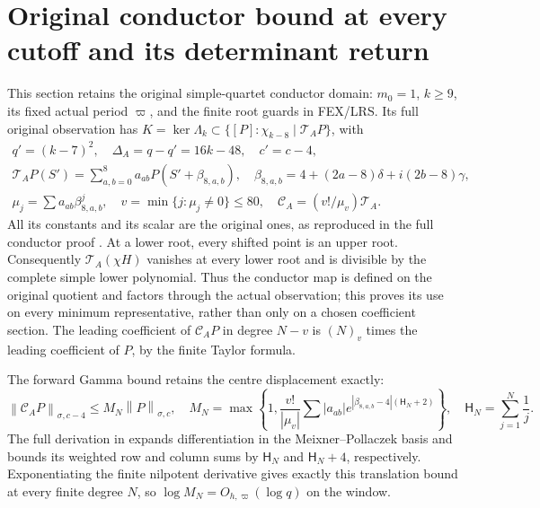 \documentclass[11pt]{article}
\newcommand{\norm}[1]{\left\lVert#1\right\rVert}
\begin{document}
\section{Original conductor bound at every cutoff and its determinant return}
This section retains the original simple-quartet conductor domain:
$m_0=1$, $k\ge9$, its fixed actual period $\varpi$, and the finite root
guards in FEX/LRS. Its full original observation has
$K=\ker\Lambda_k\subset\{[P]:\chi_{k-8}\mid\mathcal T_AP\}$, with
\begin{equation}\tag{FW46}
 \begin{gathered}
 q'=(k-7)^2,\quad \Delta_A=q-q'=16k-48,\quad c'=c-4,\\
 \mathcal T_AP(S')=\sum_{a,b=0}^{8}a_{ab}P(S'+\beta_{8,a,b}),
 \quad \beta_{8,a,b}=4+(2a-8)\delta+i(2b-8)\gamma,\\
 \mu_j=\sum a_{ab}\beta_{8,a,b}^j,\quad
 v=\min\{j:\mu_j\ne0\}\le80,\quad
 \mathcal C_A=(v!/\mu_v)\mathcal T_A.
 \end{gathered}
\end{equation}
All its constants and its scalar are the original ones, as reproduced
in the full conductor proof \cite{oid}. At a lower root, every shifted
point is an upper root. Consequently $\mathcal T_A(\chi H)$ vanishes
at every lower root and is divisible by the complete simple lower
polynomial. Thus the conductor map is defined on the original quotient
and factors through the actual observation; this proves its use on every
minimum representative, rather than only on a chosen coefficient section.
The leading coefficient of $\mathcal C_AP$ in degree $N-v$ is
$(N)_v$ times the leading coefficient of $P$, by the finite Taylor formula.

The forward Gamma bound retains the centre displacement exactly:
\[
 \norm{\mathcal C_AP}_{\sigma,c-4}\le M_N\norm P_{\sigma,c},\quad
 M_N=\max\left\{1,\frac{v!}{|\mu_v|}\sum|a_{ab}|
             e^{|\beta_{8,a,b}-4|(\mathsf H_N+2)}\right\},\quad
 \mathsf H_N=\sum_{j=1}^N\frac1j.
\]
The full derivation in \cite{oid} expands differentiation in the
Meixner--Pollaczek basis and bounds its weighted row and column sums
by $\mathsf H_N$ and $\mathsf H_N+4$, respectively. Exponentiating the
finite nilpotent derivative gives exactly this translation bound at every
finite degree $N$, so $\log M_N=O_{h,\varpi}(\log q)$ on the window.
\end{document}

